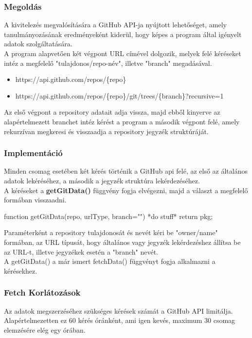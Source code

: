 \subsubsection{Megoldás}
A kivitelezés megvalósítására a GitHub API-ja nyújtott lehetőséget, amely tanulmányozásának eredményeként kiderül, hogy képes a program által igényelt adatok szolgáltatására.\\

A program alapvetően két végpont URL címével dolgozik, melyek felé kéréseket intéz a megfelelő "tulajdonos/repo-név", illetve "branch" megadásával.
\begin{itemize}
	\item https://api.github.com/repos/\{repo\}
	\item https://api.github.com/repos/\{repo\}/git/trees/\{branch\}?recursive=1
\end{itemize}

Az első végpont a repository adatait adja vissza, majd ebből kinyerve az alapértelmezett branchet intéz kérést a program a második végpont felé, amely rekurzívan megkeresi és visszaadja a repository jegyzék struktúráját.

\subsubsection{Implementáció}
Minden csomag esetében két kérés történik a GitHub api felé, az első az általános adatok lekéréséhez, a második a jegyzék struktúra lekérdezéséhez.\\

A kéréseket a \textbf{getGitData()} függvény fogja elvégezni, majd a választ a megfelelő formában visszaadni.

\begin{cpp}
	function getGitData(repo, urlType, branch=""){  
		*do stuff*
		return pkg;
	}
\end{cpp}
Paraméterként a repository tulajdonosát és nevét kéri be "owner/name" formában, az URL típusát, hogy általános vagy jegyzék lekérdezéshez állítsa be az URL-t, illetve jegyzékek esetén a "branch" nevét.\\

A getGitData() a már ismert fetchData() függvényt fogja alkalmazni a kérésekhez.

\subsubsection{Fetch Korlátozások}
Az adatok megszerzéséhez szükséges kérések számát a GitHub API limitálja. Alapértelmezetten ez 60 kérés óránként, ami igen kevés, maximum 30 csomag elemzésére elég egy órában.

